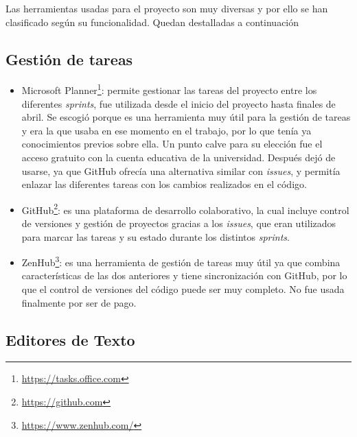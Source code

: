 Las herramientas usadas para el proyecto son muy diversas y por ello se han clasificado según su funcionalidad. Quedan destalladas a continuación

\subsection{Gestión de tareas}\label{gestión-de-tareas}

\begin{itemize}
    \item Microsoft Planner\footnote{\url{https://tasks.office.com}}: permite gestionar las tareas del proyecto entre los diferentes \textit{sprints}, fue utilizada desde el inicio del proyecto hasta finales de abril. Se escogió porque es una herramienta muy útil para la gestión de tareas y era la que usaba en ese momento en el trabajo, por lo que tenía ya conocimientos previos sobre ella. Un punto calve para su elección fue el acceso gratuito con la cuenta educativa de la universidad. Después dejó de usarse, ya que GitHub ofrecía una alternativa similar con \textit{issues}, y permitía enlazar las diferentes tareas con los cambios realizados en el código.
    \item GitHub\footnote{\url{https://github.com}}: es una plataforma de desarrollo colaborativo, la cual incluye control de versiones y gestión de proyectos gracias a los \textit{issues}, que eran utilizados para marcar las tareas y su estado durante los distintos \textit{sprints}.
    \item ZenHub\footnote{\url{https://www.zenhub.com/}}: es una herramienta de gestión de tareas muy útil ya que combina características de las dos anteriores y tiene sincronización con GitHub, por lo que el control de versiones del código puede ser muy completo. No fue usada finalmente por ser de pago.
\end{itemize}


\subsection{Editores de Texto}

